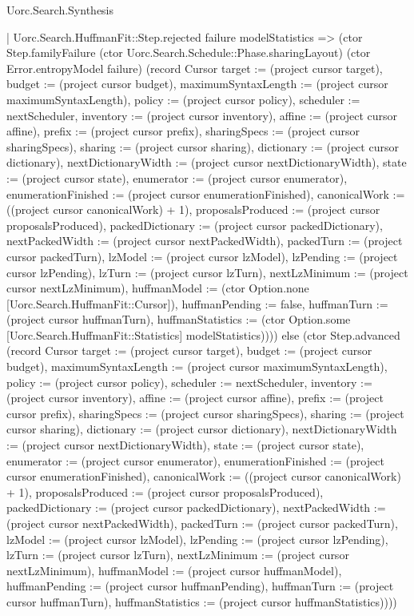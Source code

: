 \begin{lexlean}{Uorc.Search.Synthesis}
\begin{semanticmodule}
{      | Uorc.Search.HuffmanFit::Step.rejected failure modelStatistics => (ctor Step.familyFailure (ctor Uorc.Search.Schedule::Phase.sharingLayout) (ctor Error.entropyModel failure) (record Cursor {target := (project cursor target), budget := (project cursor budget), maximumSyntaxLength := (project cursor maximumSyntaxLength), policy := (project cursor policy), scheduler := nextScheduler, inventory := (project cursor inventory), affine := (project cursor affine), prefix := (project cursor prefix), sharingSpecs := (project cursor sharingSpecs), sharing := (project cursor sharing), dictionary := (project cursor dictionary), nextDictionaryWidth := (project cursor nextDictionaryWidth), state := (project cursor state), enumerator := (project cursor enumerator), enumerationFinished := (project cursor enumerationFinished), canonicalWork := ((project cursor canonicalWork) + 1), proposalsProduced := (project cursor proposalsProduced), packedDictionary := (project cursor packedDictionary), nextPackedWidth := (project cursor nextPackedWidth), packedTurn := (project cursor packedTurn), lzModel := (project cursor lzModel), lzPending := (project cursor lzPending), lzTurn := (project cursor lzTurn), nextLzMinimum := (project cursor nextLzMinimum), huffmanModel := (ctor Option.none [Uorc.Search.HuffmanFit::Cursor]), huffmanPending := false, huffmanTurn := (project cursor huffmanTurn), huffmanStatistics := (ctor Option.some [Uorc.Search.HuffmanFit::Statistics] modelStatistics)}))) else (ctor Step.advanced (record Cursor {target := (project cursor target), budget := (project cursor budget), maximumSyntaxLength := (project cursor maximumSyntaxLength), policy := (project cursor policy), scheduler := nextScheduler, inventory := (project cursor inventory), affine := (project cursor affine), prefix := (project cursor prefix), sharingSpecs := (project cursor sharingSpecs), sharing := (project cursor sharing), dictionary := (project cursor dictionary), nextDictionaryWidth := (project cursor nextDictionaryWidth), state := (project cursor state), enumerator := (project cursor enumerator), enumerationFinished := (project cursor enumerationFinished), canonicalWork := ((project cursor canonicalWork) + 1), proposalsProduced := (project cursor proposalsProduced), packedDictionary := (project cursor packedDictionary), nextPackedWidth := (project cursor nextPackedWidth), packedTurn := (project cursor packedTurn), lzModel := (project cursor lzModel), lzPending := (project cursor lzPending), lzTurn := (project cursor lzTurn), nextLzMinimum := (project cursor nextLzMinimum), huffmanModel := (project cursor huffmanModel), huffmanPending := (project cursor huffmanPending), huffmanTurn := (project cursor huffmanTurn), huffmanStatistics := (project cursor huffmanStatistics)})))
}
\end{semanticmodule}
\end{lexlean}

